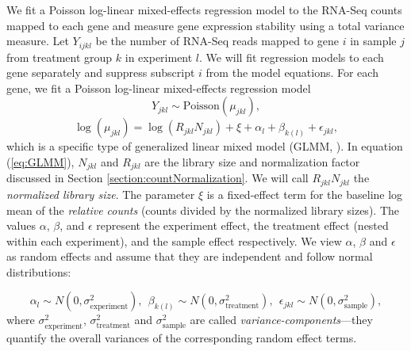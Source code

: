 \documentclass[fleqn,10pt,lineno]{wlpeerj} %
\begin{document}
We fit a Poisson log-linear mixed-effects regression model to the
RNA-Seq counts mapped to each gene and measure gene expression stability using
a total variance measure. Let $Y_{ijkl}$ be the number of RNA-Seq reads mapped to gene
$i$ in sample $j$ from treatment group $k$  in experiment $l$. We will fit
regression models to each gene separately and suppress subscript $i$ from the
model equations.  For each gene, we fit a Poisson log-linear mixed-effects regression model 
\begin{equation}
Y_{jkl} \sim \text{Poisson}(\mu_{jkl}),
\end{equation}
\begin{equation}\label{eq:GLMM}
\log( \mu_{jkl}) = \log(R_{jkl}N_{jkl})+ \xi + \alpha_l + \beta_{k(l)} + \epsilon_{jkl},
\end{equation}
which is a specific type of generalized linear mixed model (GLMM, 
\citet{mcculloch2001generalized}). 
In equation (\ref{eq:GLMM}), $N_{jkl}$ and $R_{jkl}$ are the library size and normalization factor 
discussed in
Section \ref{section:countNormalization}. We will call $R_{jkl}N_{jkl}$ 
the \textit{normalized library size}.
The parameter $\xi$ is a fixed-effect term for the baseline log mean of the {\em relative
	counts} (counts divided by the normalized library sizes). 
The values $\alpha$, $\beta$, and $\epsilon$ %
represent the experiment effect, the treatment effect (nested within each
experiment), and the sample effect respectively. 
We view  $\alpha$, $\beta$ and $\epsilon$ as random effects and assume that
they are independent and follow normal distributions:

\begin{equation}\label{eq:normalassumption}
\alpha_l\sim N(0, \sigma^2_{\text{experiment}}),~~
\beta_{k(l)}\sim N(0, \sigma^2_{\text{treatment}}),~~
\epsilon_{jkl}\sim N(0, \sigma_{\text{sample}}^2),
\end{equation}
where $\sigma_{\text{experiment}}^2$, $\sigma_{\text{treatment}}^2$ and
$\sigma_{\text{sample}}^2$ are called \textit{variance-components}---they
quantify the overall variances of the corresponding random effect terms. 
\end{document}
